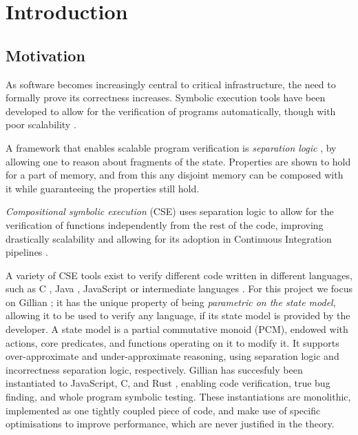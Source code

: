 \chapter{Introduction}

\section{Motivation}

As software becomes increasingly central to critical infrastructure, the need to formally prove its correctness increases. Symbolic execution tools have been developed to allow for the verification of programs automatically, though with poor scalability \cite{surveysymex}.

 A framework that enables scalable program verification is \emph{separation logic} \cite{seplogic1,seplogic2}, by allowing one to reason about fragments of the state. Properties are shown to hold for a part of memory, and from this any disjoint memory can be composed with it while guaranteeing the properties still hold.

\emph{Compositional symbolic execution} (CSE) uses separation logic to allow for the verification of functions independently from the rest of the code, improving drastically scalability \cite{pathexplo} and allowing for its adoption in Continuous Integration pipelines \cite{pulse}.

A variety of CSE tools exist to verify different code written in different languages, such as C \cite{verifast,infer,pulse}, Java \cite{jstar,verifast,infer,pulse}, JavaScript \cite{javert1} or intermediate languages \cite{corestar,viper,gillian0}. For this project we focus on Gillian \cite{gillian1,gillian2}; it has the unique property of being \emph{parametric on the state model}, allowing it to be used to verify any language, if its state model is provided by the developer. A state model is a partial commutative monoid (PCM), endowed with actions, core predicates, and functions operating on it to modify it. It supports over-approximate and under-approximate reasoning, using separation logic and incorrectness separation logic, respectively. Gillian has succesfuly been instantiated to JavaScript, C, and Rust \cite{gillian0,gillianrust}, enabling code verification, true bug finding, and whole program symbolic testing. These instantiations are monolithic, implemented as one tightly coupled piece of code, and make use of specific optimisations to improve performance, which are never justified in the theory.

